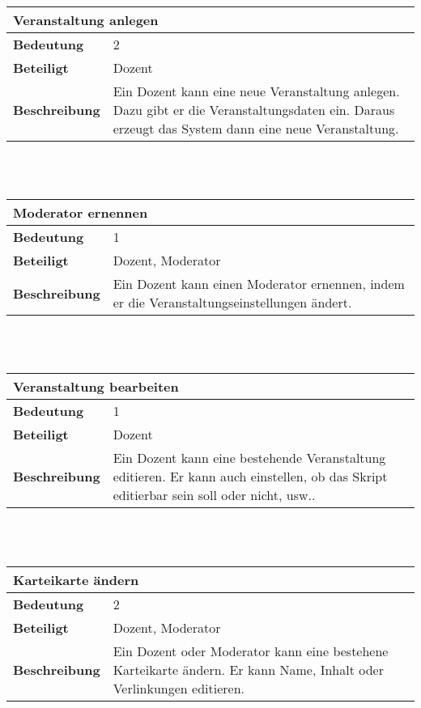 \documentclass[12pt,a4paper]{article}
\begin{document}
\begin{tabular}{l p{10cm}}
\multicolumn{2}{l}{\textbf{Veranstaltung anlegen}} \\ \hline
\textbf{Bedeutung} & 2 \\ \hline 
\textbf{Beteiligt} & Dozent \\ \hline 
\textbf{Beschreibung} & Ein Dozent kann eine neue Veranstaltung anlegen. Dazu gibt er die Veranstaltungsdaten ein. Daraus erzeugt das System dann eine neue Veranstaltung.\\ 
\hline 
\end{tabular}\\\\

\begin{tabular}{l p{10cm}}
\multicolumn{2}{l}{\textbf{Moderator ernennen}} \\ \hline
\textbf{Bedeutung} & 1 \\ \hline 
\textbf{Beteiligt} & Dozent, Moderator \\ \hline 
\textbf{Beschreibung} & Ein Dozent kann einen Moderator ernennen, indem er die Veranstaltungseinstellungen ändert.\\ 
\hline 
\end{tabular}\\\\

\begin{tabular}{l p{10cm}}
\multicolumn{2}{l}{\textbf{Veranstaltung bearbeiten}} \\ \hline
\textbf{Bedeutung} & 1 \\ \hline 
\textbf{Beteiligt} & Dozent \\ \hline 
\textbf{Beschreibung} & Ein Dozent kann eine bestehende Veranstaltung editieren. Er kann auch einstellen, ob das Skript editierbar sein soll oder nicht, usw..\\ 
\hline 
\end{tabular}\\\\

\begin{tabular}{l p{10cm}}
\multicolumn{2}{l}{\textbf{Karteikarte ändern}} \\ \hline
\textbf{Bedeutung} & 2 \\ \hline 
\textbf{Beteiligt} & Dozent, Moderator \\ \hline 
\textbf{Beschreibung} & Ein Dozent oder Moderator kann eine bestehene Karteikarte ändern. Er kann Name, Inhalt oder Verlinkungen editieren.\\ 
\hline 
\end{tabular}\\\\
\end{document}
